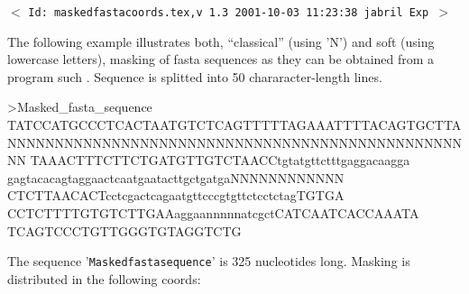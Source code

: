 \documentclass[11pt]{article}
\def\nwendcode{\endtrivlist \endgroup} %
\let\nwdocspar=\par                    %
\begin{document}
%

\newpage %
\setcounter{page}{1}
\pagestyle{fancy}
\renewcommand{\sectionmark}[1]{\markboth{}{\thesection.\ #1}}
\renewcommand{\subsectionmark}[1]{\markboth{}{\thesubsection.\ \textsl{#1}}}

\tableofcontents
\listoftables
\listoffigures

\vfill
\begin{center}
{\small$<$ \verb$Id: maskedfastacoords.tex,v 1.3 2001-10-03 11:23:38 jabril Exp $$>$ }
\end{center}


\newpage %
\setcounter{page}{1}



\description



\nwenddocs{}%
%
\nwdocspar

The following example illustrates both, ``classical'' (using 'N') and soft (using lowercase letters), masking of fasta sequences as they can be obtained from a program such {\RptM}. Sequence is splitted into 50 chararacter-length lines.

\begin{center}
\begin{minipage}[c]{0.75\linewidth}
\nwenddocs{}\endmoddef
>Masked_fasta_sequence
TATCCATGCCCTCACTAATGTCTCAGTTTTTAGAAATTTTACAGTGCTTA
NNNNNNNNNNNNNNNNNNNNNNNNNNNNNNNNNNNNNNNNNNNNNNNNNN
TAAACTTTCTTCTGATGTTGTCTAACCtgtatgttctttgaggacaagga
gagtacacagtaggaactcaatgaatacttgctgatgaNNNNNNNNNNNN
CTCTTAACACTcctcgactcagaatgttcccgtgttctcctctagTGTGA
CCTCTTTTGTGTCTTGAAaggaannnnnatcgctCATCAATCACCAAATA
TCAGTCCCTGTTGGGTGTAGGTCTG
\nwendcode{}\nwdocspar
\end{minipage}
\end{center}

The sequence '{\tt{}Masked{}fasta{}sequence}' is 325 nucleotides long. Masking is distributed in the following coords:
\end{document}

